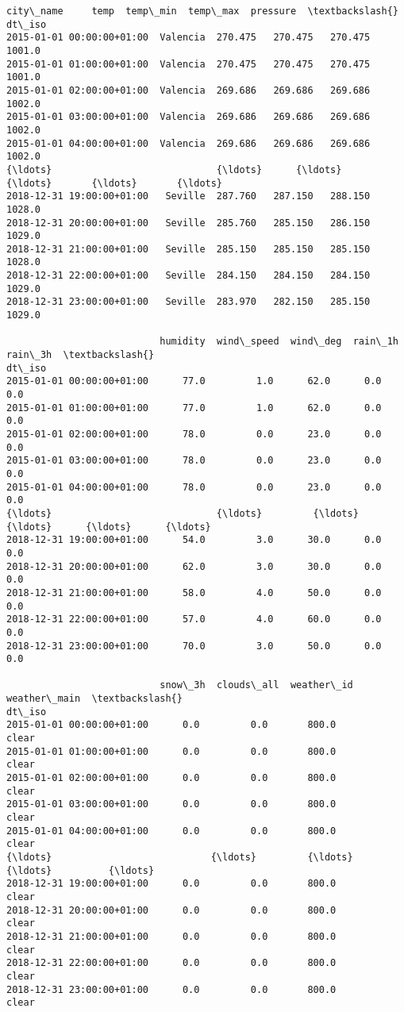 \documentclass[11pt]{article}
\makeatletter
\newcommand{\boxspacing}{\kern\kvtcb@left@rule\kern\kvtcb@boxsep}
\newcommand{\prompt}[4]{
        {\ttfamily\llap{{\color{#2}[#3]:\hspace{3pt}#4}}\vspace{-\baselineskip}}
    }
\makeatother
\begin{document}
            \begin{tcolorbox}[breakable, size=fbox, boxrule=.5pt, pad at break*=1mm, opacityfill=0]
\prompt{Out}{outcolor}{32}{\boxspacing}
\begin{Verbatim}[commandchars=\\\{\}]
                          city\_name     temp  temp\_min  temp\_max  pressure  \textbackslash{}
dt\_iso
2015-01-01 00:00:00+01:00  Valencia  270.475   270.475   270.475    1001.0
2015-01-01 01:00:00+01:00  Valencia  270.475   270.475   270.475    1001.0
2015-01-01 02:00:00+01:00  Valencia  269.686   269.686   269.686    1002.0
2015-01-01 03:00:00+01:00  Valencia  269.686   269.686   269.686    1002.0
2015-01-01 04:00:00+01:00  Valencia  269.686   269.686   269.686    1002.0
{\ldots}                             {\ldots}      {\ldots}       {\ldots}       {\ldots}       {\ldots}
2018-12-31 19:00:00+01:00   Seville  287.760   287.150   288.150    1028.0
2018-12-31 20:00:00+01:00   Seville  285.760   285.150   286.150    1029.0
2018-12-31 21:00:00+01:00   Seville  285.150   285.150   285.150    1028.0
2018-12-31 22:00:00+01:00   Seville  284.150   284.150   284.150    1029.0
2018-12-31 23:00:00+01:00   Seville  283.970   282.150   285.150    1029.0

                           humidity  wind\_speed  wind\_deg  rain\_1h  rain\_3h  \textbackslash{}
dt\_iso
2015-01-01 00:00:00+01:00      77.0         1.0      62.0      0.0      0.0
2015-01-01 01:00:00+01:00      77.0         1.0      62.0      0.0      0.0
2015-01-01 02:00:00+01:00      78.0         0.0      23.0      0.0      0.0
2015-01-01 03:00:00+01:00      78.0         0.0      23.0      0.0      0.0
2015-01-01 04:00:00+01:00      78.0         0.0      23.0      0.0      0.0
{\ldots}                             {\ldots}         {\ldots}       {\ldots}      {\ldots}      {\ldots}
2018-12-31 19:00:00+01:00      54.0         3.0      30.0      0.0      0.0
2018-12-31 20:00:00+01:00      62.0         3.0      30.0      0.0      0.0
2018-12-31 21:00:00+01:00      58.0         4.0      50.0      0.0      0.0
2018-12-31 22:00:00+01:00      57.0         4.0      60.0      0.0      0.0
2018-12-31 23:00:00+01:00      70.0         3.0      50.0      0.0      0.0

                           snow\_3h  clouds\_all  weather\_id weather\_main  \textbackslash{}
dt\_iso
2015-01-01 00:00:00+01:00      0.0         0.0       800.0        clear
2015-01-01 01:00:00+01:00      0.0         0.0       800.0        clear
2015-01-01 02:00:00+01:00      0.0         0.0       800.0        clear
2015-01-01 03:00:00+01:00      0.0         0.0       800.0        clear
2015-01-01 04:00:00+01:00      0.0         0.0       800.0        clear
{\ldots}                            {\ldots}         {\ldots}         {\ldots}          {\ldots}
2018-12-31 19:00:00+01:00      0.0         0.0       800.0        clear
2018-12-31 20:00:00+01:00      0.0         0.0       800.0        clear
2018-12-31 21:00:00+01:00      0.0         0.0       800.0        clear
2018-12-31 22:00:00+01:00      0.0         0.0       800.0        clear
2018-12-31 23:00:00+01:00      0.0         0.0       800.0        clear


\end{Verbatim}
\end{tcolorbox}
\end{document}
